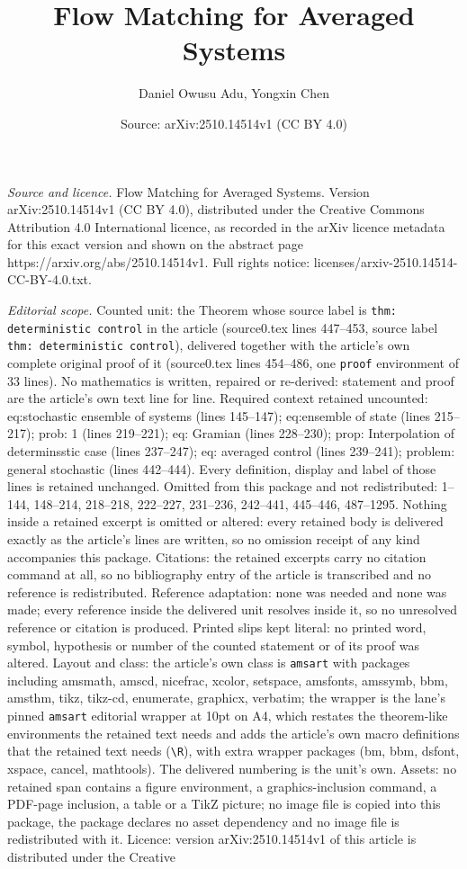 \documentclass[10pt,a4paper]{amsart}
\title[Flow Matching for Averaged Systems]{Flow Matching for Averaged Systems}
\author{Daniel Owusu Adu, Yongxin Chen}
\date{Source: arXiv:2510.14514v1 (CC BY 4.0)}
\begin{document}
\maketitle

\noindent\emph{Source and licence.} Flow Matching for Averaged Systems. Version arXiv:2510.14514v1 (CC BY 4.0), distributed under the Creative Commons Attribution 4.0 International licence, as recorded in the arXiv licence metadata for this exact version and shown on the abstract page https://arxiv.org/abs/2510.14514v1. Full rights notice: licenses/arxiv-2510.14514-CC-BY-4.0.txt.\par\smallskip

\noindent\textit{Editorial scope.} Counted unit: the Theorem whose source label is \texttt{thm: deterministic control} in the article (source0.tex lines 447--453, source label \texttt{thm: deterministic control}), delivered together with the article's own complete original proof of it (source0.tex lines 454--486, one \texttt{proof} environment of 33 lines). No mathematics is written, repaired or re-derived: statement and proof are the article's own text line for line. Required context retained uncounted: eq:stochastic ensemble of systems (lines 145--147); eq:ensemble of state (lines 215--217); prob: 1 (lines 219--221); eq: Gramian (lines 228--230); prop: Interpolation of determinsstic case (lines 237--247); eq: averaged control (lines 239--241); problem: general stochastic (lines 442--444). Every definition, display and label of those lines is retained unchanged. Omitted from this package and not redistributed: 1--144, 148--214, 218--218, 222--227, 231--236, 242--441, 445--446, 487--1295. Nothing inside a retained excerpt is omitted or altered: every retained body is delivered exactly as the article's lines are written, so no omission receipt of any kind accompanies this package. Citations: the retained excerpts carry no citation command at all, so no bibliography entry of the article is transcribed and no reference is redistributed. Reference adaptation: none was needed and none was made; every reference inside the delivered unit resolves inside it, so no unresolved reference or citation is produced. Printed slips kept literal: no printed word, symbol, hypothesis or number of the counted statement or of its proof was altered. Layout and class: the article's own class is \texttt{amsart} with packages including amsmath, amscd, nicefrac, xcolor, setspace, amsfonts, amssymb, bbm, amsthm, tikz, tikz-cd, enumerate, graphicx, verbatim; the wrapper is the lane's pinned \texttt{amsart} editorial wrapper at 10pt on A4, which restates the theorem-like environments the retained text needs and adds the article's own macro definitions that the retained text needs (\texttt{\textbackslash R}), with extra wrapper packages (bm, bbm, dsfont, xspace, cancel, mathtools). The delivered numbering is the unit's own. Assets: no retained span contains a figure environment, a graphics-inclusion command, a PDF-page inclusion, a table or a TikZ picture; no image file is copied into this package, the package declares no asset dependency and no image file is redistributed with it. Licence: version arXiv:2510.14514v1 of this article is distributed under the Creative 
\end{document}
